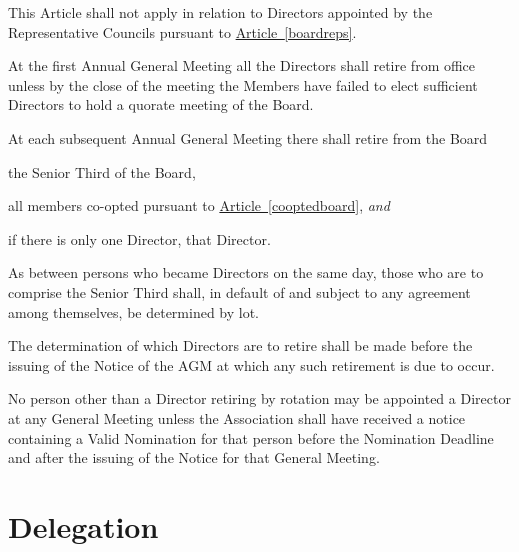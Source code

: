 \documentclass[12pt]{article}
\newcommand{\EC}[0]{Board}
\newcommand{\Exec}[0]{\EC{} }
\newcommand{\ITand}[0]{\textit{and}}
\newcommand{\articleref}[1]{\hyperref[#1]{Article~\ref*{#1}}}
\begin{document}
\begin{constenum}

\item This Article shall not apply in relation to Directors appointed by the
  Representative Councils pursuant to \articleref{boardreps}.

\item At the first Annual General Meeting all the Directors shall retire from
  office unless by the close of the meeting the Members have failed to
  elect sufficient Directors to hold a quorate meeting of the \EC.

\item At each subsequent Annual General Meeting
  there shall retire from the \Exec
  \begin{constenum}
  \item the Senior Third of the \EC{},
  \item all members co-opted pursuant to
    \articleref{cooptedboard}, \ITand
  \item if there is only one Director, that Director.
  \end{constenum}

\item As between persons who became Directors on the same day, those
  who are to comprise the Senior Third shall, in default of and
  subject to any agreement among themselves, be determined by lot.

\item The determination of which Directors are to retire shall be made
  before the issuing of the Notice of the AGM at which any
  such retirement is due to occur.

\item No person other than a Director retiring by rotation may be
  appointed a Director at any General Meeting unless the Association
  shall have received a notice containing a Valid Nomination for that
  person before the Nomination Deadline and after the issuing of the
  Notice for that General Meeting.

\end{constenum}


\section{Delegation}
\end{document}
